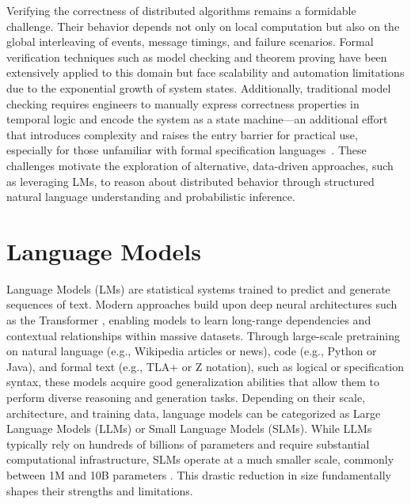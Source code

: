 Verifying the correctness of distributed algorithms remains a formidable challenge. Their behavior depends not only on local computation but also on the global interleaving of events, message timings, and failure scenarios. Formal verification techniques such as model checking and theorem proving \cite{clarke1999modelchecking} have been extensively applied to this domain but face scalability and automation limitations due to the exponential growth of system states. Additionally, traditional model checking requires engineers to manually express correctness properties in temporal logic and encode the system as a state machine—an additional effort that introduces complexity and raises the entry barrier for practical use, especially for those unfamiliar with formal specification languages~\cite{fakhfakh2018formal}. These challenges motivate the exploration of alternative, data-driven approaches, such as leveraging LMs, to reason about distributed behavior through structured natural language understanding and probabilistic inference.
\section{Language Models}
Language Models (LMs) are statistical systems trained to predict and generate sequences of text. 
Modern approaches build upon deep neural architectures such as the Transformer \cite{vaswani2017transformer}, enabling models to learn long-range dependencies and contextual relationships within massive datasets. Through large-scale pretraining on natural language  (e.g., Wikipedia articles or news), code (e.g., Python or Java), and formal text  (e.g., TLA+ or Z notation), such as logical or specification syntax, these models acquire good generalization abilities that allow them to perform diverse reasoning and generation tasks. 
Depending on their scale, architecture, and training data, language models can be categorized as Large Language Models (LLMs) or Small Language Models (SLMs). While LLMs typically rely on hundreds of billions of parameters and require substantial computational infrastructure, SLMs operate at a much smaller scale, commonly between 1M and 10B parameters \cite{hasana2024slmcode,huggingfaceSLM}. This drastic reduction in size fundamentally shapes their strengths and limitations.

